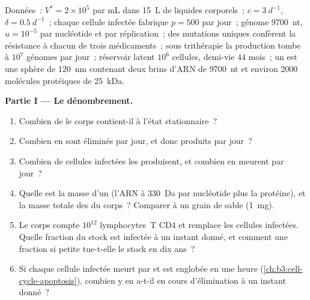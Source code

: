 \begin{problem}
\label{pb:b3:virology:1}
Données~:  $V^{*} = 2\times 10^{5}$ par mL dans
\qty{15}{L} de liquides corporels~; $c = \qty{3}{d^{-1}}$,
$\delta = \qty{0.5}{d^{-1}}$~; chaque cellule infectée fabrique
$p = 500$  par jour~; génome \qty{9700}{nt},
$u = 10^{-5}$ par nucléotide et par réplication~; des mutations uniques
confèrent la résistance à chacun de trois médicaments~; sous
trithérapie la production tombe à $10^{7}$ génomes par jour~; réservoir
latent $10^{6}$ cellules, demi-vie $44$ mois~; un  est une sphère
de \qty{120}{nm} contenant deux brins d'ARN de \qty{9700}{nt} et
environ \num{2000} molécules protéiques de \qty{25}{kDa}.

\medskip
\noindent\textbf{Partie I --- Le dénombrement.}
\begin{enumerate}
  \item Combien de  le corps contient-il à l'état stationnaire~?
  \item Combien en sont éliminés par jour, et donc produits par jour~?
  \item Combien de cellules infectées les produisent, et combien en
        meurent par jour~?
  \item Quelle est la masse d'un  (l'ARN à \qty{330}{Da} par
        nucléotide plus la protéine), et la masse totale des  du
        corps~? Comparer à un grain de sable (\qty{1}{mg}).
  \item Le corps compte $10^{12}$ lymphocytes~T CD4 et remplace les
        cellules infectées. Quelle fraction du stock est infectée à un
        instant donné, et comment une fraction si petite tue-t-elle le
        stock en dix ans~?
  \item Si chaque cellule infectée meurt par  et est englobée
        en une heure (\cref{ch:b3:cell-cycle-apoptosis}), combien y
        en a-t-il en cours d'élimination à un instant donné~?
\end{enumerate}


\end{problem}

